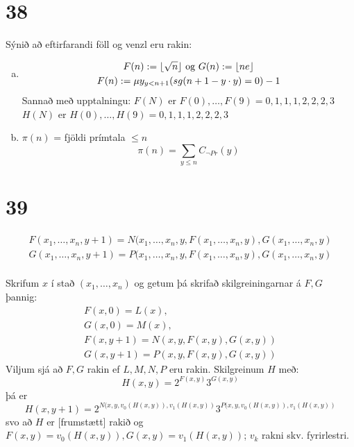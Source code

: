\documentclass[12pt]{book}
\newcommand{\xxn}{x_1, \dotsc, x_n}
\begin{document}
\section{38}
Sýnið að eftirfarandi föll og venzl eru rakin:

\begin{enumerate}[(a)]
\item 
  \begin{gather*}
    F(n) := \lfloor \sqrt{n} \rfloor \text{ og } G(n) := \lfloor ne \rfloor\\
    F(n) := \mu y_{y < n+1} (sg (n+1 - y \cdot y) = 0) -1
  \end{gather*}
  Sannað með upptalningu:
  $F(N)$ er $F(0), \dotsc, F(9) = 0,1,1,1,2,2,2,3$
  $H(N)$ er $H(0), \dotsc, H(9) = 0,1,1,1,2,2,2,3$

\item $\pi(n)$ = fjöldi prímtala $\leq n$
\[\pi(n) = \sum_{y \leq n} C_{\lnot Pr}(y)\]
\end{enumerate}

\section{39}

\begin{daemi}
  \begin{gather*}
    F(\xxn,y+1) = N(\xxn,y,F(\xxn,y),G(\xxn,y)\\
    G(\xxn,y+1) = P(\xxn,y,F(\xxn,y),G(\xxn,y)\\
  \end{gather*}
  \begin{lausn}
  Skrifum $x$ í stað $(\xxn)$ og getum þá skrifað skilgreiningarnar á $F,G$
  þannig:
  \begin{gather*}
    F(x,0) = L(x),\\
    G(x,0) = M(x),\\
    F(x,y+1) = N(x,y,F(x,y),G(x,y))\\
    G(x,y+1) = P(x,y,F(x,y),G(x,y))
  \end{gather*}
  Viljum sjá að $F,G$ rakin ef $L,M,N,P$ eru rakin.
  Skilgreinum $H$ með:
  \[H(x,y) = 2^{F(x,y)} 3^{G(x,y)} \]
  þá er 
  \[ H(x,y+1) = 2^{N(x,y,v_0(H(x,y)),v_1(H(x,y))} 3^{P(x,y,v_0(H(x,y)),v_1(H(x,y))} \]
  svo að $H$ er [frumstætt] rakið og $F(x,y) = v_0(H(x,y)), G(x,y) = v_1(H(x,y))$;
  $v_k$ rakni skv. fyrirlestri.
  \end{lausn}

\end{daemi}
\end{document}
